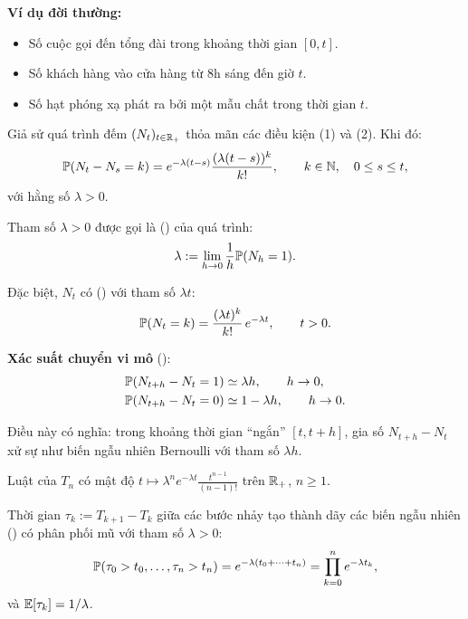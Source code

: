 \textbf{Ví dụ đời thường:}
\begin{itemize}[nosep]
  \item Số cuộc gọi đến tổng đài trong khoảng thời gian $[0, t]$.
  \item Số khách hàng vào cửa hàng từ 8h sáng đến giờ $t$.
  \item Số hạt phóng xạ phát ra bởi một mẫu chất trong thời gian $t$.
\end{itemize}

\begin{dinhly}
Giả sử quá trình đếm $(N_t)_{t\in\mathbb{R}_+}$ thỏa mãn các điều kiện (1) và (2). Khi đó:
\[
  \mathbb{P}(N_t - N_s = k) = e^{-\lambda(t-s)} \frac{(\lambda(t-s))^k}{k!}, \qquad k \in \mathbb{N}, \quad 0 \leq s \leq t,
\]
với hằng số $\lambda > 0$.
\end{dinhly}

Tham số $\lambda > 0$ được gọi là  () của quá trình:
\begin{equation}\label{eq:intensity}
  \lambda := \lim_{h \to 0} \frac{1}{h} \mathbb{P}(N_h = 1).
\end{equation}

Đặc biệt, $N_t$ có  () với tham số $\lambda t$:
\[
  \mathbb{P}(N_t = k) = \frac{(\lambda t)^k}{k!}\, e^{-\lambda t}, \qquad t > 0.
\]

\textbf{Xác suất chuyển vi mô} ():
\begin{align}
  \mathbb{P}(N_{t+h} - N_t = 1) &\simeq \lambda h, \qquad h \to 0, \label{eq:poisson-inf-1}\\
  \mathbb{P}(N_{t+h} - N_t = 0) &\simeq 1 - \lambda h, \qquad h \to 0. \label{eq:poisson-inf-0}
\end{align}

Điều này có nghĩa: trong khoảng thời gian ``ngắn'' $[t, t+h]$, gia số $N_{t+h} - N_t$ xử sự như biến ngẫu nhiên Bernoulli với tham số $\lambda h$.

\begin{proposition}
Luật của $T_n$ có mật độ $t \mapsto \lambda^n e^{-\lambda t} \frac{t^{n-1}}{(n-1)!}$ trên $\mathbb{R}_+$, $n \geq 1$.
\end{proposition}

Thời gian $\tau_k := T_{k+1} - T_k$ giữa các bước nhảy tạo thành dãy các biến ngẫu nhiên  () có phân phối mũ với tham số $\lambda > 0$:
\[
  \mathbb{P}(\tau_0 > t_0, \ldots, \tau_n > t_n) = e^{-\lambda(t_0 + \cdots + t_n)} = \prod_{k=0}^n e^{-\lambda t_k},
\]
và $\mathbb{E}[\tau_k] = 1/\lambda$.

